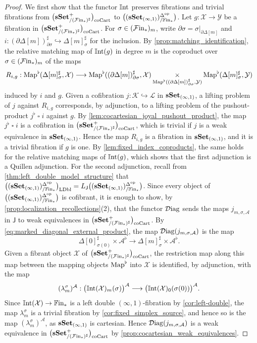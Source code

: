 \documentclass[10pt,reqno]{amsart}
\begin{document}
\begin{proof}
We first show that the functor $\mathbb{I}\mathrm{nt}$ preserves fibrations and
trivial fibrations from $\bigl(\mathbf{sSet}^+_{/(\mathcal{F}\mathrm{in}_*)^\sharp}\bigr)_{\mathrm{coCart}}$ to $\bigl((\mathbf{sSet}_{(\infty,1)})^{\Delta^{\mathrm{op}}}_{/\mathbb{F}\mathrm{in}_*}\bigr)$. Let
$g:\mathcal X\to \mathcal Y$ be a fibration in $\bigl(\mathbf{sSet}^+_{/(\mathcal{F}\mathrm{in}_*)^\sharp}\bigr)_{\mathrm{coCart}}$. For
$\sigma\in (\mathcal{F}\mathrm{in}_*)_m$, write
$\partial\sigma=\sigma|_{\partial\Delta[m]}$ and
$i:(\partial\Delta[m])^\sharp_{\partial\sigma}
\hookrightarrow\Delta[m]^\sharp_\sigma$ for the inclusion. By
\cref{prop:matching_identification}, the relative matching map of
$\mathbb{I}\mathrm{nt}(g)$ in degree $m$ is the coproduct over
$\sigma\in(\mathcal{F}\mathrm{in}_*)_m$ of the maps
\[
 R_{i,g}:\operatorname{Map}^\flat(\Delta[m]^\sharp_\sigma,\mathcal X)\longrightarrow
 \operatorname{Map}^\flat((\partial\Delta[m])^\sharp_{\partial\sigma},\mathcal X)
 \mathop{\times}_{\operatorname{Map}^\flat((\partial\Delta[m])^\sharp_{\partial\sigma},\mathcal Y)}
 \operatorname{Map}^\flat(\Delta[m]^\sharp_\sigma,\mathcal Y)
\]
induced by $i$ and $g$. Given a cofibration
$j:\mathcal K\hookrightarrow\mathcal L$ in $\mathbf{sSet}_{(\infty,1)}$, a
lifting problem of $j$ against $R_{i,g}$ corresponds, by
adjunction, to a lifting problem of the pushout-product
$j^\flat\mathbin{\square}i$ against $g$. By
\cref{lem:cocartesian_joyal_pushout_product}, the map
$j^\flat\mathbin{\square}i$ is a cofibration in $\bigl(\mathbf{sSet}^+_{/(\mathcal{F}\mathrm{in}_*)^\sharp}\bigr)_{\mathrm{coCart}}$, which is
trivial if $j$ is a weak equivalence in $\mathbf{sSet}_{(\infty,1)}$. Hence
the map $R_{i,g}$ is a fibration in $\mathbf{sSet}_{(\infty,1)}$, and it is
a trivial fibration if $g$ is one. By
\cref{lem:fixed_index_coproducts}, the same holds for the relative
matching maps of $\mathbb{I}\mathrm{nt}(g)$, which shows that the first adjunction is
a Quillen adjunction. For the second adjunction, recall from
\cref{thm:left_double_model_structure} that
$\bigl((\mathbf{sSet}_{(\infty,1)})^{\Delta^{\mathrm{op}}}_{/\mathbb{F}\mathrm{in}_*}\bigr)_{\mathrm{LDbl}}=L_{\mathsf J}\bigl((\mathbf{sSet}_{(\infty,1)})^{\Delta^{\mathrm{op}}}_{/\mathbb{F}\mathrm{in}_*}\bigr)$. Since every object of
$\bigl((\mathbf{sSet}_{(\infty,1)})^{\Delta^{\mathrm{op}}}_{/\mathbb{F}\mathrm{in}_*}\bigr)$ is cofibrant, it is enough to show, by
\cref{prop:localization_recollections}(2), that the functor $\mathcal{D}\mathrm{iag}$
sends the maps $j_{m,\sigma,\mathcal A}$ in $\mathsf J$ to weak
equivalences in $\bigl(\mathbf{sSet}^+_{/(\mathcal{F}\mathrm{in}_*)^\sharp}\bigr)_{\mathrm{coCart}}$. By
\eqref{eq:marked_diagonal_external_product}, the map
$\mathcal{D}\mathrm{iag}(j_{m,\sigma,\mathcal A})$ is the map
\[
 \Delta[0]^\sharp_{\sigma(0)}\times \mathcal A^\flat
 \longrightarrow\Delta[m]^\sharp_\sigma\times \mathcal A^\flat.
\]
Given a fibrant object $\mathcal X$ of $\bigl(\mathbf{sSet}^+_{/(\mathcal{F}\mathrm{in}_*)^\sharp}\bigr)_{\mathrm{coCart}}$, the restriction
map along this map between the mapping objects $\operatorname{Map}^\flat$ into
$\mathcal X$ is identified, by adjunction, with the map
\[
 (\lambda_m^\sigma)^{\mathcal A}:
 \bigl(\mathbb{I}\mathrm{nt}(\mathcal X)_m(\sigma)\bigr)^{\mathcal A}
 \longrightarrow\bigl(\mathbb{I}\mathrm{nt}(\mathcal X)_0(\sigma(0))\bigr)^{\mathcal A}.
\]
Since $\mathbb{I}\mathrm{nt}(\mathcal X)\to\mathbb{F}\mathrm{in}_*$ is a left double
$(\infty,1)$-fibration by \cref{cor:left-double}, the map
$\lambda_m^\sigma$ is a trivial fibration by
\cref{cor:fixed_simplex_source}, and hence so is the map
$(\lambda_m^\sigma)^{\mathcal A}$, as $\mathbf{sSet}_{(\infty,1)}$ is
cartesian. Hence $\mathcal{D}\mathrm{iag}(j_{m,\sigma,\mathcal A})$ is a weak
equivalence in $\bigl(\mathbf{sSet}^+_{/(\mathcal{F}\mathrm{in}_*)^\sharp}\bigr)_{\mathrm{coCart}}$ by
\cref{prop:cocartesian_weak_equivalences}.
\end{proof}
\end{document}
